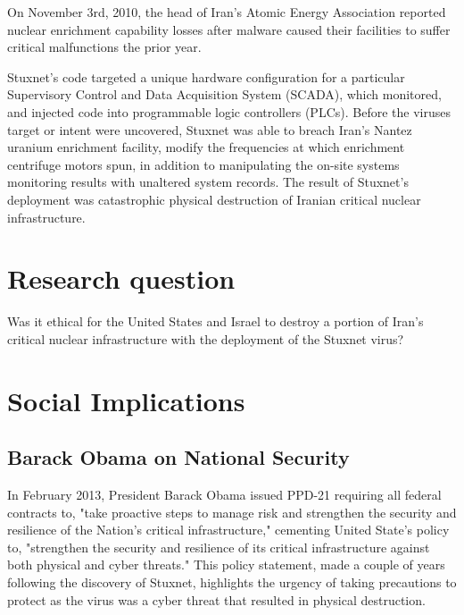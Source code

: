 \documentclass[12pt]{article}
\begin{document}
\begin{multicols}{2}
On November 3rd, 2010, the head of Iran's Atomic Energy Association reported nuclear enrichment capability losses after malware caused their facilities to suffer critical malfunctions the prior year.\cite{didStuxnetTakeOut1000Centrifuges} 

Stuxnet's code targeted a unique hardware configuration for a particular Supervisory Control and Data Acquisition System (SCADA), which monitored, and injected code into programmable logic controllers (PLCs). Before the viruses target or intent were uncovered, Stuxnet was able to breach Iran's Nantez uranium enrichment facility, modify the frequencies at which enrichment centrifuge motors spun, in addition to manipulating the on-site systems monitoring results with unaltered system records. The result of Stuxnet's deployment was catastrophic physical destruction of Iranian critical nuclear infrastructure.\cite{w32.stuxnetDossier}\cite{lessonsFromStuxnet}


\section{Research question}

Was it ethical for the United States and Israel to destroy a portion of Iran's critical nuclear infrastructure with the deployment of the Stuxnet virus?

\section{Social Implications}

\subsection{Barack Obama on National Security}

In February 2013, President Barack Obama issued PPD-21 requiring all federal contracts to, "take proactive steps to manage risk and strengthen the security and resilience of the Nation’s critical infrastructure," cementing United State's policy to, "strengthen the security and resilience of its critical infrastructure against both physical and cyber threats."\cite{industrialCyberVulnerabilities} This policy statement, made a couple of years following the discovery of Stuxnet, highlights the urgency of taking precautions to protect as the virus was a cyber threat that resulted in physical destruction.


\end{multicols}
\end{document}
